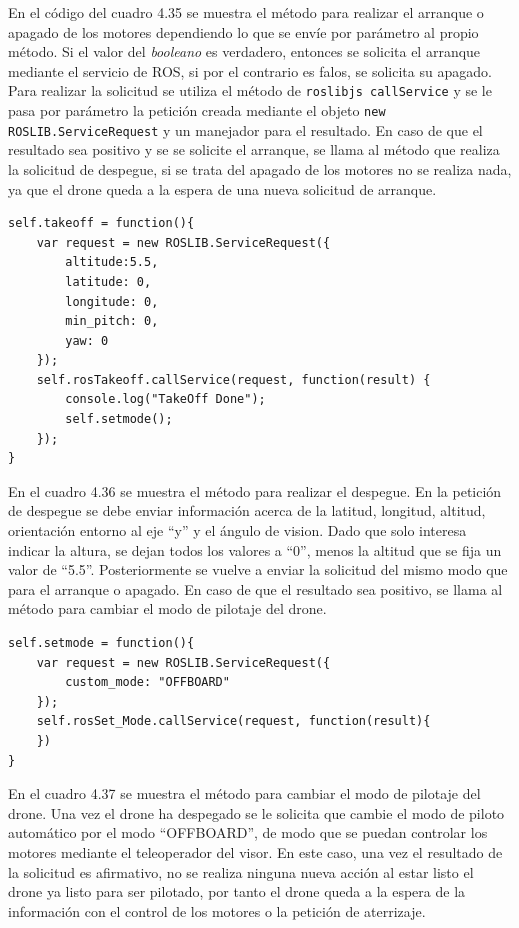 En el código del cuadro 4.35 se muestra el método para realizar el arranque o apagado de los motores dependiendo lo que se envíe por parámetro al propio método. Si el valor del \textit{booleano} es verdadero, entonces se solicita el arranque mediante el servicio de ROS, si por el contrario es falos, se solicita su apagado. Para realizar la solicitud se utiliza el método de \texttt{roslibjs callService} y se le pasa por parámetro la petición creada mediante el objeto \texttt{new ROSLIB.ServiceRequest} y un manejador para el resultado. En caso de que el resultado sea positivo y se se solicite el arranque, se llama al método que realiza la solicitud de despegue, si se trata del apagado de los motores no se realiza nada, ya que el drone queda a la espera de una nueva solicitud de arranque.

\begin{lstlisting}[caption= Método para arrancar o apagar los motores del drone, label=cod.takeoff]
self.takeoff = function(){
	var request = new ROSLIB.ServiceRequest({
		altitude:5.5,
		latitude: 0,
		longitude: 0,
		min_pitch: 0,
		yaw: 0
	});
	self.rosTakeoff.callService(request, function(result) {
		console.log("TakeOff Done");
		self.setmode();
	});
}
\end{lstlisting}

En el cuadro 4.36 se muestra el método para realizar el despegue. En la petición de despegue se debe enviar información acerca de la latitud, longitud, altitud, orientación entorno al eje ``y'' y el ángulo de vision. Dado que solo interesa indicar la altura, se dejan todos los valores a ``0'', menos la altitud que se fija un valor de ``5.5''. Posteriormente se vuelve a enviar la solicitud del mismo modo que para el arranque o apagado. En caso de que el resultado sea positivo, se llama al método para cambiar el modo de pilotaje del drone.

\begin{lstlisting}[caption= Método para cambiar el modo de pilotaje, label=cod.setMode]
self.setmode = function(){
	var request = new ROSLIB.ServiceRequest({
		custom_mode: "OFFBOARD"
	});
	self.rosSet_Mode.callService(request, function(result){
	})
}
\end{lstlisting}

En el cuadro 4.37 se muestra el método para cambiar el modo de pilotaje del drone. Una vez el drone ha despegado se le solicita que cambie el modo de piloto automático por el modo ``OFFBOARD'', de modo que se puedan controlar los motores mediante el teleoperador del visor. En este caso, una vez el resultado de la solicitud es afirmativo, no se realiza ninguna nueva acción al estar listo el drone ya listo para ser pilotado, por tanto el drone queda a la espera de la información con el control de los motores o la petición de aterrizaje.

